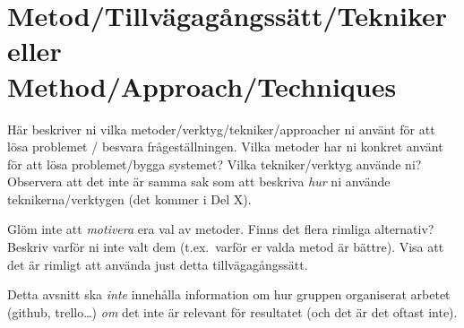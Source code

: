 \documentclass[a4paper,12pt]{article}
\begin{document}
\section{Metod/Tillvägagångssätt/Tekniker eller Method/Approach/Techniques}
Här beskriver ni vilka metoder/verktyg/tekniker/approacher ni använt för att lösa problemet / besvara frågeställningen.  Vilka metoder har ni konkret använt för att lösa problemet/bygga systemet?  Vilka tekniker/verktyg använde ni? Observera att det inte är samma sak som att beskriva \emph{hur} ni använde teknikerna/verktygen (det kommer i Del X).

Glöm inte att \emph{motivera} era val av metoder. Finns det flera rimliga alternativ? Beskriv varför ni inte valt dem (t.ex.~varför er valda metod är bättre).
Visa att det är rimligt att använda just detta tillvägagångssätt.

Detta avsnitt ska \emph{inte} innehålla information om hur gruppen organiserat arbetet (github, trello\ldots) \emph{om} det inte är relevant för resultatet (och det är det oftast inte).
\end{document}
